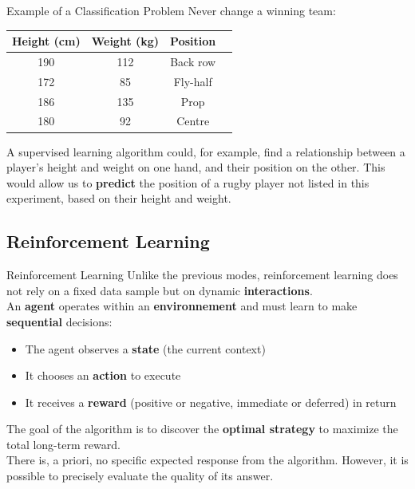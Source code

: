 \begin{frame}{Example of a Classification Problem}
	Never change a winning team:
	\begin{table}
		\centering
		\begin{tabular}{|c|c|c|c|}
			\hline
			\textbf{Height} (cm) & \textbf{Weight} (kg) & \textbf{Position} \\ \hline
			190              & 112 &  Back row       \\
			172              & 85  &  Fly-half \\
			186              & 135 &  Prop           \\
			180              & 92  &  Centre           \\
			\hline
		\end{tabular}
	\end{table}
	A supervised learning algorithm could, for example, find a relationship between a player's height and weight on one hand, and their position on the other. This would allow us to \textbf{predict} the position of a rugby player not listed in this experiment, based on their height and weight.
\end{frame}

\subsection[Reinforcement Learning]{Reinforcement Learning}

\begin{frame}{Reinforcement Learning}
	Unlike the previous modes, reinforcement learning does not rely on a fixed data sample but on dynamic \textbf{interactions}. \\
	\vspace{0.5cm}
	An \textbf{agent} operates within an \textbf{environnement} and must learn to make \textbf{sequential} decisions:
	\begin{itemize}
		\item The agent observes a \textbf{state} (the current context)
		\item It chooses an \textbf{action} to execute
		\item It receives a \textbf{reward} (positive or negative, immediate or deferred) in return
	\end{itemize}
	\vspace{0.5cm}
	The goal of the algorithm is to discover the \textbf{optimal strategy} to maximize the total long-term reward. \\
	\vspace{0.5cm}
	There is, a priori, no specific expected response from the algorithm. However, it is possible to precisely evaluate the quality of its answer.
\end{frame}

